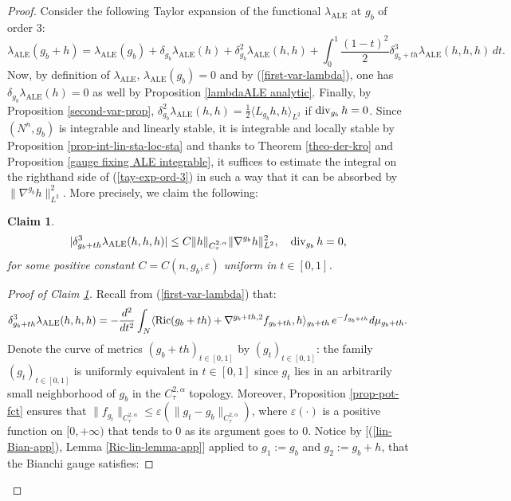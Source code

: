 \documentclass[a4paper,11pt,reqno]{amsart}
\newtheorem{claim}{Claim}
\def\Ric{\mathop{\rm Ric}\nolimits}
\def\div{\mathop{\rm div}\nolimits}
\def\Ric{\mathop{\rm Ric}\nolimits}
\def\div{\mathop{\rm div}\nolimits}
\numberwithin{equation}{section}
\begin{document}
	\begin{proof}
		Consider the following Taylor expansion of the functional $\lambda_{\operatorname{ALE}}$ at $g_b$ of order $3$:
		\begin{equation}
		\lambda_{\operatorname{ALE}}(g_b+h)=\lambda_{\operatorname{ALE}}(g_b)+\delta_{g_b}\lambda_{\operatorname{ALE}}(h)+\delta^2_{g_b}\lambda_{\operatorname{ALE}}(h,h)+\int_0^1\frac{(1-t)^2}{2}\delta_{g_b+th}^3\lambda_{\operatorname{ALE}}(h,h,h)\,dt.\label{tay-exp-ord-3}
		\end{equation}
		Now, by definition of $\lambda_{\operatorname{ALE}}$, $\lambda_{\operatorname{ALE}}(g_b)=0$ and by (\ref{first-var-lambda}), one has $\delta_{g_b}\lambda_{\operatorname{ALE}}(h)=0$ as well by Proposition \ref{lambdaALE analytic}. Finally, by Proposition \ref{second-var-prop}, $\delta^2_{g_b}\lambda_{\operatorname{ALE}}(h,h)=\frac{1}{2}\langle L_{g_b}h,h\rangle_{L^2}$ if $\div_{g_b}h=0$. Since $(N^n,g_b)$ is integrable and linearly stable, it is integrable and locally stable by Proposition \ref{prop-int-lin-sta-loc-sta} and thanks to Theorem \ref{theo-der-kro} and Proposition \ref{gauge fixing ALE integrable}, it suffices to estimate the integral on the righthand side of (\ref{tay-exp-ord-3}) in such a way that it can be absorbed by $\|\nabla^{g_b} h\|^2_{L^2}$. More precisely, we claim the following:
		\begin{claim}\label{third-der-est}
			\begin{equation*}
			|\delta_{g_b+th}^3\lambda_{\operatorname{ALE}}(h,h,h)|\leq C\|h\|_{C^{2,\alpha}_{\tau}}\|\nabla^{g_b} h\|_{L^2}^2,\quad \div_{g_b}h=0,
			\end{equation*}
			for some positive constant $C=C(n,g_b,\varepsilon)$ uniform in $t\in[0,1]$.
		\end{claim}
		\begin{proof}[Proof of Claim \ref{third-der-est}]
			Recall from (\ref{first-var-lambda}) that:
			\begin{equation*}
			\delta^3_{g_b+th} \lambda_{\operatorname{ALE}}(h,h,h)=-\frac{d^2}{dt^2}\int_N\langle \Ric(g_b+th)+\nabla^{g_b+th,2}f_{g_b+th},h\rangle_{g_b+th} \,e^{-f_{g_b+th}}d\mu_{g_b+th}.
			\end{equation*}
			Denote the curve of metrics $(g_b+th)_{t\in[0,1]}$ by $(g_t)_{t\in[0,1]}$: the family $(g_t)_{t\in[0,1]}$ is uniformly equivalent in $t\in[0,1]$ since $g_t$ lies in an arbitrarily small neighborhood of $g_b$ in the $C^{2,\alpha}_{\tau}$ topology. Moreover, Proposition \ref{prop-pot-fct} ensures that $\|f_{g_t}\|_{C^{2,\alpha}_{\tau}}\leq \varepsilon\left(\|g_t-g_b\|_{C^{2,\alpha}_{\tau}}\right)$, where $\varepsilon(\cdot)$ is a positive function on $[0,+\infty)$ that tends to $0$ as its argument goes to $0$. Notice by [(\ref{lin-Bian-app}), Lemma \ref{Ric-lin-lemma-app}] applied to $g_1:=g_b$ and $g_2:=g_b+h$, that the Bianchi gauge satisfies:

\end{proof}
\end{proof}
\end{document}
